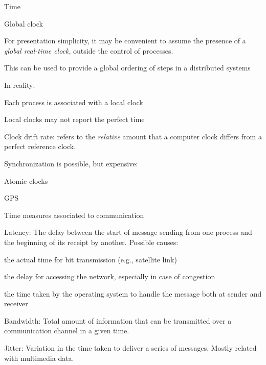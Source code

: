 \begin{frame}{Time}
\BIL
\item \alert{Global clock}
  \BI
  \item
  For presentation simplicity, it may be convenient to assume
  the presence of a {\em global real-time clock}, outside the control of processes.
  \item This can be used to provide a global ordering of steps in a distributed systems
  \EI
\item \alert{In reality}:
  \BI
  \item Each process is associated with a \alert{local clock}
  \item Local clocks may not report the perfect time
  \item \alert{Clock drift rate}: refers to the {\em relative} amount that a computer
    clock differs from a perfect reference clock.
  \EI
\item Synchronization is possible, but expensive:
  \BI
    \item Atomic clocks
    \item GPS
  \EI
\EI


\end{frame}

\begin{frame}{Time measures associated to communication}

\BIL
\item \alert{Latency}: The delay between the start of message sending from one process and the
  beginning of its receipt by another. Possible causes:
  \BI
   \item the actual time for bit transmission (e.g., satellite link)
   \item the delay for accessing the network, especially in case
     of congestion
   \item the time taken by the operating system to handle the message
     both at sender and receiver
  \EI
\item \alert{Bandwidth}: Total amount of information that can be transmitted
  over a communication channel in a given time. 
\item \alert{Jitter}: Variation in the time taken to deliver a series of
  messages. Mostly related with multimedia data.
\EIL
\end{frame}



